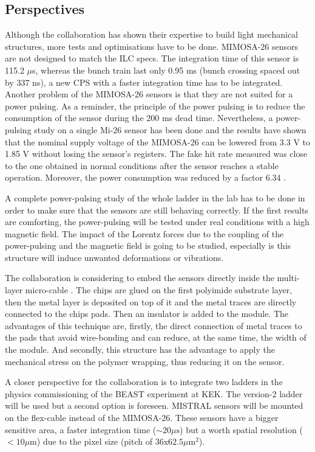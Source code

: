     \subsection{Perspectives}

    Although the collaboration has shown their expertise to build light mechanical structures, more tests and optimisations have to be done.
    MIMOSA-26 sensors are not designed to match the \gls{ILC} specs. 
    The integration time of this sensor is 115.2 $\mu$s, whereas the bunch train last only 0.95 ms (bunch crossing spaced out by 337 ns), a new CPS with a faster integration time has to be integrated.
    Another problem of the MIMOSA-26 sensors is that they are not suited for a power pulsing. As a reminder, the principle of the power pulsing is to reduce the consumption of the sensor during the 200 ms dead time. 
    Nevertheless, a power-pulsing study on a single Mi-26 sensor has been done and the results have shown that the nominal supply voltage of the MIMOSA-26 can be lowered from 3.3 V to 1.85 V without losing the sensor's registers. 
    The fake hit rate measured was close to the one obtained in  normal conditions after the sensor reaches a stable operation.
    Moreover, the power consumption was reduced by a factor 6.34 \cite{Kuprash2013}. 

    A complete power-pulsing study of the whole ladder in the lab has to be done in order to make sure that the sensors are still behaving correctly.
    If the first results are comforting, the power-pulsing will be tested under real conditions with a high magnetic field.
    The impact of the Lorentz forces due to the coupling of the power-pulsing and the magnetic field is going to be studied, especially is this structure will induce unwanted deformations or vibrations. 

    The collaboration is considering to embed the sensors directly inside the multi-layer micro-cable \cite{Baudot2012}.
    The chips are glued on the first polyimide substrate layer, then the metal layer is deposited on top of it and the metal traces are directly connected to the chips pads.
    Then an insulator is added to the module.
    The advantages of this technique are, firstly, the direct connection of metal traces to the pads that avoid wire-bonding and can reduce, at the same time, the width of the module.
    And secondly, this structure has the advantage to apply the mechanical stress on the polymer wrapping, thus reducing it on the sensor.

    A closer perspective for the collaboration is to integrate two ladders in the physics commissioning of the BEAST experiment at KEK.
    The version-2 ladder will be used but a second option is foreseen.
    MISTRAL sensors will be mounted on the flex-cable instead of the MIMOSA-26.
    These sensors have a bigger sensitive area, a faster integration time  ($\sim 20\mu\text{s}$) but a worth spatial resolution ($< 10 \mu\text{m}$) due to the pixel size (pitch of $36 \text{x} 62.5 \mu\text{m}^2$).


